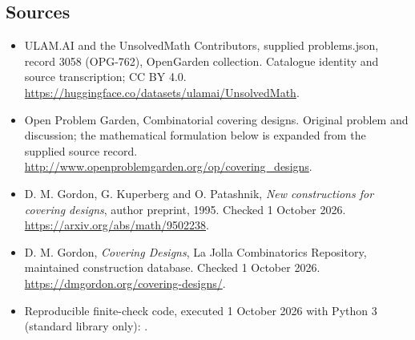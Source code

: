 \documentclass[11pt,a4paper]{article}
\begin{document}
\subsection{Sources}
\begin{itemize}
\item[S1] ULAM.AI and the UnsolvedMath Contributors, supplied problems.json, record 3058 (OPG-762), OpenGarden collection. Catalogue identity and source transcription; CC BY 4.0.
\url{https://huggingface.co/datasets/ulamai/UnsolvedMath}.
\item[S2] Open Problem Garden, Combinatorial covering designs. Original problem and discussion; the mathematical formulation below is expanded from the supplied source record.
\url{http://www.openproblemgarden.org/op/covering_designs}.
\item[S3] D. M. Gordon, G. Kuperberg and O. Patashnik, \emph{New constructions for covering designs}, author preprint, 1995. Checked 1 October 2026.
\url{https://arxiv.org/abs/math/9502238}.
\item[S4] D. M. Gordon, \emph{Covering Designs}, La Jolla Combinatorics Repository, maintained construction database. Checked 1 October 2026.
\url{https://dmgordon.org/covering-designs/}.
\item[C1] Reproducible finite-check code, executed 1 October 2026 with Python 3 (standard library only):
.
\end{itemize}
\end{document}
